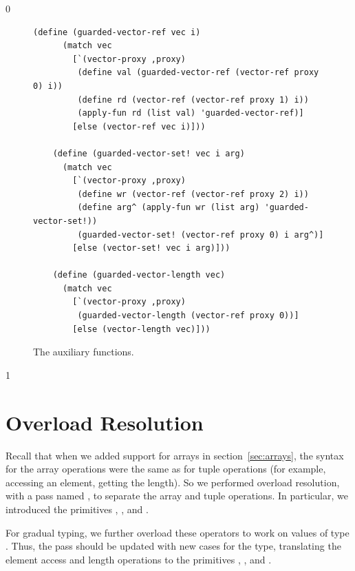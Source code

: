\documentclass[7x10]{TimesAPriori_MIT}%
\def\racketEd{0}
\def\pythonEd{1}
\def\edition{1}
\newcommand{\pythonColor}[0]{}
\numberwithin{theorem}{chapter}
\numberwithin{definition}{chapter}
\numberwithin{equation}{chapter}
\begin{document}
{\if\edition\racketEd    
\begin{figure}[tbp]
\begin{tcolorbox}[colback=white]  
\begin{lstlisting}[basicstyle=\ttfamily\footnotesize]
    (define (guarded-vector-ref vec i)
      (match vec
        [`(vector-proxy ,proxy)
         (define val (guarded-vector-ref (vector-ref proxy 0) i))
         (define rd (vector-ref (vector-ref proxy 1) i))
         (apply-fun rd (list val) 'guarded-vector-ref)]
        [else (vector-ref vec i)]))
        
    (define (guarded-vector-set! vec i arg)
      (match vec
        [`(vector-proxy ,proxy)
         (define wr (vector-ref (vector-ref proxy 2) i))
         (define arg^ (apply-fun wr (list arg) 'guarded-vector-set!))
         (guarded-vector-set! (vector-ref proxy 0) i arg^)]
        [else (vector-set! vec i arg)]))
        
    (define (guarded-vector-length vec)
      (match vec
        [`(vector-proxy ,proxy)
         (guarded-vector-length (vector-ref proxy 0))]
        [else (vector-length vec)]))
\end{lstlisting}
\end{tcolorbox}

\caption{The  auxiliary functions.}
  \label{fig:guarded-tuple}
\end{figure}
\fi}

{\if\edition\pythonEd\pythonColor
\section{Overload Resolution}
\label{sec:gradual-resolution}

Recall that when we added support for arrays in
section~\ref{sec:arrays}, the syntax for the array operations were the
same as for tuple operations (for example, accessing an element, getting the
length). So we performed overload resolution, with a pass named
, to separate the array and tuple operations.  In
particular, we introduced the primitives ,
, and .

For gradual typing, we further overload these operators to work on
values of type \CANYTY{}. Thus, the  pass should be
updated with new cases for the \CANYTY{} type, translating the element
access and length operations to the primitives ,
, and .

\fi}
\end{document}
